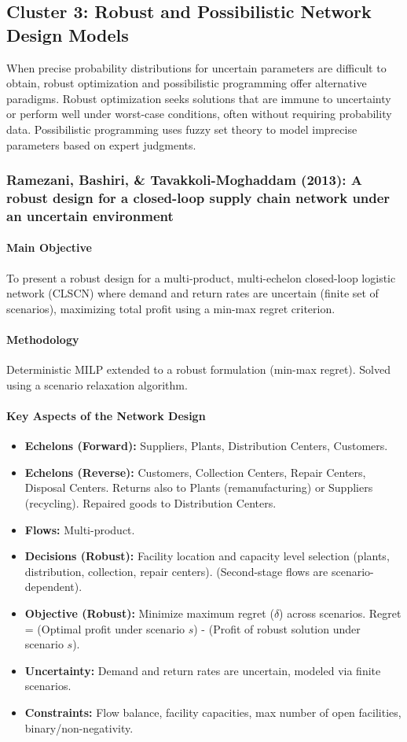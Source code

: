 \subsection{Cluster 3: Robust and Possibilistic Network Design Models}
When precise probability distributions for uncertain parameters are difficult to obtain, robust optimization and possibilistic programming offer alternative paradigms. Robust optimization seeks solutions that are immune to uncertainty or perform well under worst-case conditions, often without requiring probability data. Possibilistic programming uses fuzzy set theory to model imprecise parameters based on expert judgments.

\subsubsection{Ramezani, Bashiri, \& Tavakkoli-Moghaddam (2013): A robust design for a closed-loop supply chain network under an uncertain environment}
\paragraph{Main Objective} To present a robust design for a multi-product, multi-echelon closed-loop logistic network (CLSCN) where demand and return rates are uncertain (finite set of scenarios), maximizing total profit using a min-max regret criterion.
\paragraph{Methodology} Deterministic MILP extended to a robust formulation (min-max regret). Solved using a scenario relaxation algorithm.
\paragraph{Key Aspects of the Network Design}
\begin{itemize}
    \item \textbf{Echelons (Forward):} Suppliers, Plants, Distribution Centers, Customers.
    \item \textbf{Echelons (Reverse):} Customers, Collection Centers, Repair Centers, Disposal Centers. Returns also to Plants (remanufacturing) or Suppliers (recycling). Repaired goods to Distribution Centers.
    \item \textbf{Flows:} Multi-product.
    \item \textbf{Decisions (Robust):} Facility location and capacity level selection (plants, distribution, collection, repair centers). (Second-stage flows are scenario-dependent).
    \item \textbf{Objective (Robust):} Minimize maximum regret ($\delta$) across scenarios. Regret = (Optimal profit under scenario $s$) - (Profit of robust solution under scenario $s$).
    \item \textbf{Uncertainty:} Demand and return rates are uncertain, modeled via finite scenarios.
    \item \textbf{Constraints:} Flow balance, facility capacities, max number of open facilities, binary/non-negativity.
\end{itemize}
